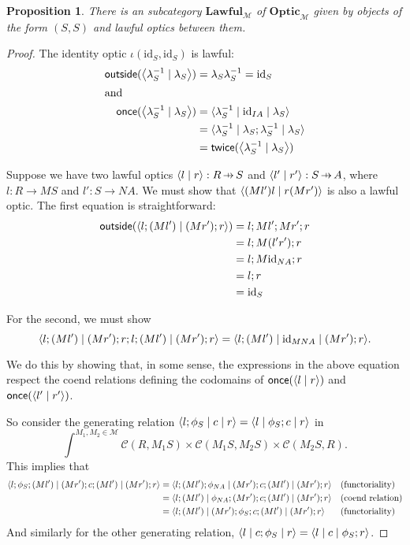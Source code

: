 \documentclass[11pt,a4paper]{article}
\theoremstyle{plain}
\newtheorem{proposition}[theorem]{Proposition}
\theoremstyle{definition}
\newcommand{\C}{\mathscr{C}}
\newcommand{\M}{\mathscr{M}}
\newcommand{\Optic}{\mathbf{Optic}}
\newcommand{\Lawful}{\mathbf{Lawful}}
\newcommand{\id}{\mathrm{id}}
\newcommand{\rep}[2]{{\ensuremath \left\langle #1 \mid #2 \right\rangle}}
\newcommand{\repthree}[3]{{\ensuremath \langle #1 \mid #2 \mid #3 \rangle}}
\newcommand{\outside}{\mathsf{outside}}
\newcommand{\once}{\mathsf{once}}
\newcommand{\twice}{\mathsf{twice}}
\newcommand{\hto}{\ensuremath{\,\mathaccent\shortmid\rightarrow\,}}
\begin{document}
\begin{proposition}
  There is an subcategory $\Lawful_\M$ of $\Optic_\M$ given by objects of the form $(S, S)$ and lawful optics between them.
\end{proposition}
\begin{proof}
  The identity optic $\iota(\id_S, \id_S)$ is lawful:
  \begin{align*}
    \outside(\rep{\lambda^{-1}_S}{\lambda_{S}}) &= \lambda_{S} \lambda^{-1}_S = \id_S \\
    \intertext{and}
    \once(\rep{\lambda^{-1}_S}{\lambda_{S}})
                                                          &= \repthree{\lambda^{-1}_S}{\id_{IA}}{\lambda_{S}} \\
                                                          &= \repthree{\lambda^{-1}_S}{\lambda_{S};\lambda^{-1}_S}{\lambda_{S}} \\
                                                          &= \twice(\rep{\lambda^{-1}_S}{\lambda_{S}})
  \end{align*}

  Suppose we have two lawful optics $\rep{l}{r} : R \hto S$ and $\rep{l'}{r'} : S \hto A$, where $l : R \to MS$ and $l' : S \to NA$. We must show that $\rep{(Ml')l}{r (Mr') }$ is also a lawful optic. The first equation is straightforward:
  \begin{align*}
    \outside(\rep{l; (Ml')}{(Mr') ; r  })
    &= l ; Ml' ; Mr' ; r \\
    &= l ; M(l'r') ; r \\
    &= l ; M\id_{NA} ; r \\
    &= l ; r \\
    &= \id_S
  \end{align*}

  For the second, we must show
  \[ \repthree{ l;(Ml')}{(Mr'); r;l;(Ml')}{(Mr') ; r } = \repthree{l;(Ml')}{\id_{MNA}}{(Mr') ; r }. \]

  We do this by showing that, in some sense, the expressions in the above equation respect the coend relations defining the codomains of $\once(\rep{l}{r})$ and $\once(\rep{l'}{r'})$.

  So consider the generating relation $\repthree{ l;\phi_S}{c}{r} = \repthree{l}{\phi_S ; c}{r}$ in \[\int^{M_1, M_2 \in \M} \C(R, M_1 S) \times \C(M_1 S, M_2 S) \times \C(M_2 S, R).\]
  This implies that
  \begin{align*}
    \repthree{l;\phi_S;(Ml')}{(Mr'); c ;(Ml')}{(Mr') ; r}
    &= \repthree{l;(Ml');\phi_{NA}}{(Mr'); c ;(Ml')}{(Mr') ; r} && \text{(functoriality)} \\
    &= \repthree{l;(Ml')}{\phi_{NA};(Mr'); c ;(Ml')}{(Mr') ; r} && \text{(coend relation)} \\
    &= \repthree{l;(Ml')}{(Mr');\phi_{S}; c ;(Ml')}{(Mr') ; r} && \text{(functoriality)}
  \end{align*}
  And similarly for the other generating relation, $\repthree{l}{c;\phi_S}{r } = \repthree{l}{c}{\phi_S; r }$.


\end{proof}
\end{document}

